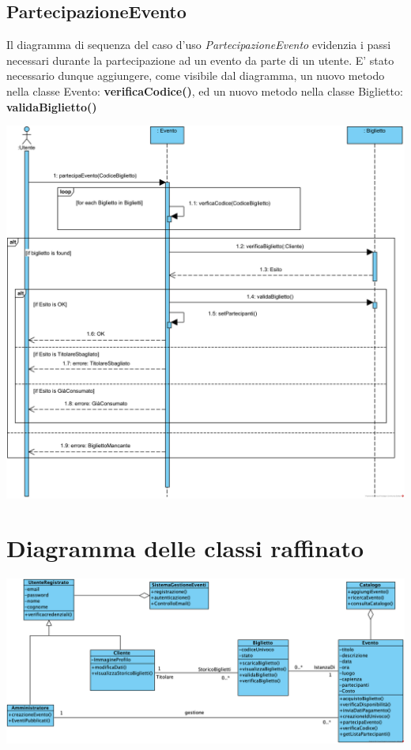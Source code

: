 \vspace{2ex}

\small
\newpage
\subsection{PartecipazioneEvento}

\begin{center}
Il diagramma di sequenza del caso d’uso \textit{PartecipazioneEvento} evidenzia i passi necessari durante la partecipazione ad un evento da parte di un utente. E' stato necessario dunque aggiungere, come visibile dal diagramma, un nuovo metodo nella classe Evento: \textbf{verificaCodice()}, ed un nuovo metodo nella classe Biglietto: \textbf{validaBiglietto()}

\vspace{1ex}
\includegraphics[height=0.38\textheight]{assets/casid'uso/PartecipazioneEvento.png}
\vspace{1ex}
\end{center}


\section{Diagramma delle classi raffinato}
\begin{center}	
	\vspace{1ex}
	\includegraphics[height=0.38\linewidth]{assets/casid'uso/DiagrammaDelleClassiRaffinato.png}
	\vspace{1ex}
\end{center}